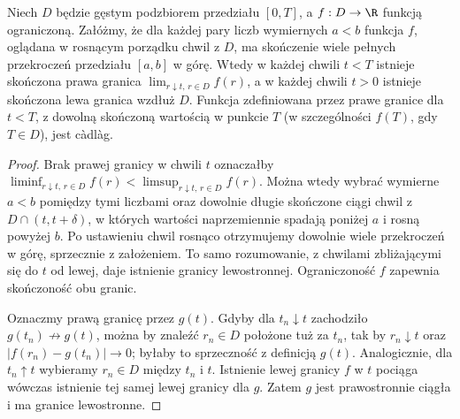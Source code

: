 \begin{lemat}
Niech $D$ będzie gęstym podzbiorem przedziału $[0,T]$,
a $f:D\to\R$ funkcją ograniczoną. Załóżmy, że dla każdej
pary liczb wymiernych $a<b$ funkcja $f$, oglądana w
rosnącym porządku chwil z $D$, ma skończenie wiele pełnych
przekroczeń przedziału $[a,b]$ w górę. Wtedy w każdej chwili
$t<T$ istnieje skończona prawa granica
$\lim_{r\downarrow t,\,r\in D}f(r)$, a w każdej chwili
$t>0$ istnieje skończona lewa granica wzdłuż $D$.
Funkcja zdefiniowana przez prawe granice dla $t<T$,
z dowolną skończoną wartością w punkcie $T$
(w szczególności $f(T)$, gdy $T\in D$), jest c\`adl\`ag.
\end{lemat}
\begin{proof}
Brak prawej granicy w chwili $t$ oznaczałby
$\liminf_{r\downarrow t,\,r\in D}f(r)
<\limsup_{r\downarrow t,\,r\in D}f(r)$.
Można wtedy wybrać wymierne $a<b$ pomiędzy tymi
liczbami oraz dowolnie długie skończone ciągi chwil
z $D\cap(t,t+\delta)$, w których wartości naprzemiennie
spadają poniżej $a$ i rosną powyżej $b$.
Po ustawieniu chwil rosnąco otrzymujemy dowolnie wiele
przekroczeń w górę, sprzecznie z założeniem.
To samo rozumowanie, z chwilami zbliżającymi się do $t$
od lewej, daje istnienie granicy lewostronnej.
Ograniczoność $f$ zapewnia skończoność obu granic.

Oznaczmy prawą granicę przez $g(t)$. Gdyby dla
$t_n\downarrow t$ zachodziło $g(t_n)\not\to g(t)$,
można by znaleźć $r_n\in D$ położone tuż za $t_n$,
tak by $r_n\downarrow t$ oraz
$|f(r_n)-g(t_n)|\to0$; byłaby to sprzeczność z
definicją $g(t)$. Analogicznie, dla $t_n\uparrow t$
wybieramy $r_n\in D$ między $t_n$ i $t$.
Istnienie lewej granicy $f$ w $t$ pociąga wówczas
istnienie tej samej lewej granicy dla $g$.
Zatem $g$ jest prawostronnie ciągła i ma granice
lewostronne.
\end{proof}

